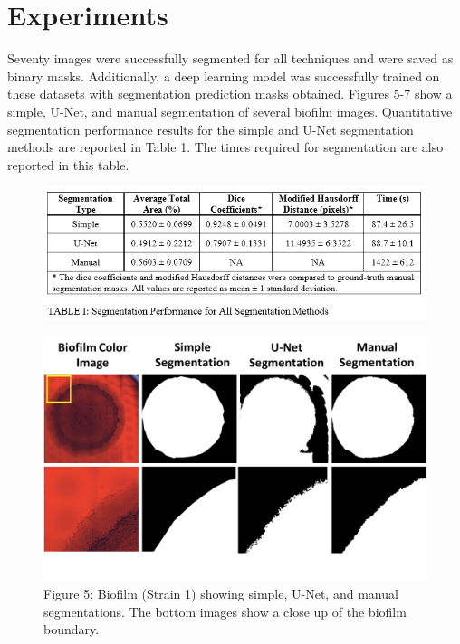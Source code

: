 \documentclass[conference]{IEEEtran}
\begin{document}
\section{Experiments}
Seventy images were successfully segmented for all techniques and were saved as binary masks. Additionally, a deep learning model was successfully trained on these datasets with segmentation prediction masks obtained. Figures 5-7 show a simple, U-Net, and manual segmentation of several biofilm images. Quantitative segmentation performance results for the simple and U-Net segmentation methods are reported in Table 1. The times required for segmentation are also reported in this table.

\begin{figure}[h]
\centering
\includegraphics[scale=0.5]{Table1.PNG}
\label{Table1}
\end{figure}

\begin{figure}[h]
\centering
\includegraphics[scale=0.25]{Slide5.PNG}
\caption{Figure 5: Biofilm (Strain 1) showing simple, U-Net, and manual segmentations. The bottom images show a close up of the biofilm boundary.}
\label{figName5}
\end{figure}
\end{document}
